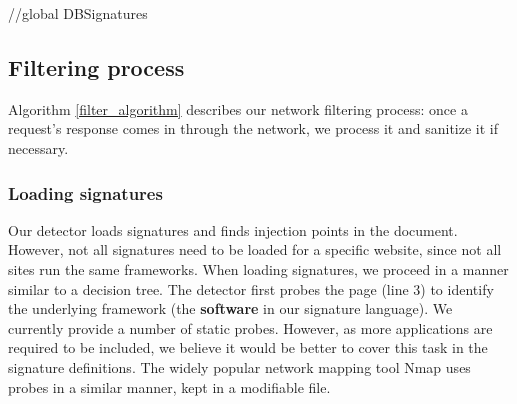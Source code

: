 \begin{algorithm} 
	\SetAlgoLined
	//global DBSignatures\\
\end{algorithm}

\subsection{Filtering process} \label{filtering_process}
Algorithm \ref{filter_algorithm} describes our network filtering process: once a request's response comes in through the network, we process it and sanitize it if necessary.

\subsubsection{Loading signatures} \label{loading_signatures}
Our detector loads signatures and finds injection points in the document. However, not all signatures need to be loaded for a specific website, since not all sites run the same frameworks. When loading signatures, we proceed in a manner similar to a decision tree. The detector first probes the page (line 3) to identify the underlying framework (the \textbf{software} in our signature language). We currently provide a number of static probes. However, as more applications are required to be included, we believe it would be better to cover this task in the signature definitions. The widely popular network mapping tool Nmap \cite{nMap} uses probes in a similar manner, kept in a modifiable file.

